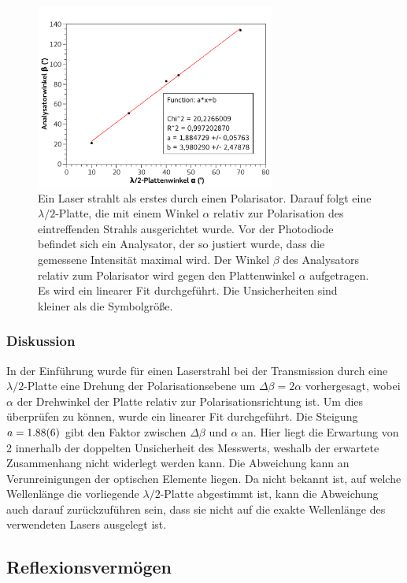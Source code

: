 \documentclass[
	a4paper,
	12pt,
	pagesize,
	ngerman
]{scrartcl}
\begin{document}
	\begin{figure}[H]
		\includegraphics[width=0.7\textwidth]{fig_lambda}
		\centering
		\caption{Ein Laser strahlt als erstes durch einen Polarisator. 
		Darauf folgt eine $\lambda/2$-Platte, die mit einem Winkel $\alpha$ relativ zur Polarisation des eintreffenden Strahls ausgerichtet wurde. 
		Vor der Photodiode befindet sich ein Analysator, der so justiert wurde, dass die gemessene Intensität maximal wird.
		Der Winkel $\beta$ des Analysators relativ zum Polarisator wird gegen den Plattenwinkel $\alpha$ aufgetragen.
		Es wird ein linearer Fit durchgeführt.
		Die Unsicherheiten sind kleiner als die Symbolgröße.}
		\label{fig_lambda}
		\centering
	\end{figure}

	\subsubsection{Diskussion}
	In der Einführung wurde für einen Laserstrahl bei der Transmission durch eine $\lambda/2$-Platte eine Drehung der Polarisationsebene um $\Delta\beta=2\alpha$ vorhergesagt, wobei $\alpha$ der Drehwinkel der Platte relativ zur Polarisationsrichtung ist.
	Um dies überprüfen zu können, wurde ein linearer Fit durchgeführt.
	Die Steigung $a=\SI{1,88+-0,06}{}$ gibt den Faktor zwischen $\Delta\beta$ und $\alpha$ an.
	Hier liegt die Erwartung von 2 innerhalb der doppelten Unsicherheit des Messwerts, weshalb der erwartete Zusammenhang nicht widerlegt werden kann.
	Die Abweichung kann an Verunreinigungen der optischen Elemente liegen.
	Da nicht bekannt ist, auf welche Wellenlänge die vorliegende $\lambda /2$-Platte abgestimmt ist, kann die Abweichung auch darauf zurückzuführen sein, dass sie nicht auf die exakte Wellenlänge des verwendeten Lasers ausgelegt ist.
	
	\subsection{Reflexionsvermögen}
\end{document}
